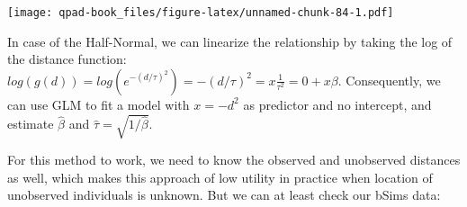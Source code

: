 \documentclass[12pt,]{book}
\newenvironment{Shaded}{\begin{snugshade}}{\end{snugshade}}
\newcommand{\ControlFlowTok}[1]{\textcolor[rgb]{0.13,0.29,0.53}{\textbf{#1}}}
\newcommand{\DataTypeTok}[1]{\textcolor[rgb]{0.13,0.29,0.53}{#1}}
\newcommand{\DecValTok}[1]{\textcolor[rgb]{0.00,0.00,0.81}{#1}}
\newcommand{\KeywordTok}[1]{\textcolor[rgb]{0.13,0.29,0.53}{\textbf{#1}}}
\newcommand{\NormalTok}[1]{#1}
\newcommand{\OperatorTok}[1]{\textcolor[rgb]{0.81,0.36,0.00}{\textbf{#1}}}
\newcommand{\OtherTok}[1]{\textcolor[rgb]{0.56,0.35,0.01}{#1}}
\newcommand{\StringTok}[1]{\textcolor[rgb]{0.31,0.60,0.02}{#1}}
\begin{document}
\begin{Shaded}
\end{Shaded}

\texttt{[image: qpad-book\_files/figure-latex/unnamed-chunk-84-1.pdf]}

In case of the Half-Normal, we can linearize the relationship
by taking the log of the distance function:
\(log(g(d)) =log(e^{-(d/\tau)^2})= -(d / \tau)^2 = x \frac{1}{\tau^2} = 0 + x \beta\).
Consequently, we can use GLM to fit a model with \(x = -d^2\) as
predictor and no intercept, and estimate \(\hat{\beta}\) and
\(\hat{\tau}=\sqrt{1/\hat{\beta}}\).

For this method to work, we need to know the observed and
unobserved distances as well,
which makes this approach of low utility in practice when
location of unobserved individuals is unknown.
But we can at least check our bSims data:

\begin{Shaded}
\end{Shaded}
\end{document}
